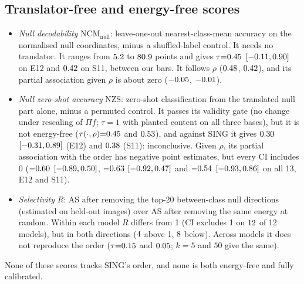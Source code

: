 \documentclass[10pt]{article}
\begin{document}
\subsection{Translator-free and energy-free scores}
\label{app:tfree}
\begin{itemize}
\item \emph{Null decodability} NCM$_{\mathrm{null}}$: leave-one-out nearest-class-mean accuracy on the normalised null coordinates, minus a shuffled-label control. It needs no translator. It ranges from $5.2$ to $80.9$ points and gives $\tau{=}0.45$ $[-0.11,0.90]$ on E12 and $0.42$ on S11, between our bars. It follows $\rho$ ($0.48$, $0.42$), and its partial association given $\rho$ is about zero ($-0.05$, $-0.01$).
\item \emph{Null zero-shot accuracy} NZS: zero-shot classification from the translated null part alone, minus a permuted control. It passes its validity gate (no change under rescaling of $\Pi f$; $\tau{=}1$ with planted content on all three bases), but it is not energy-free ($\tau(\cdot,\rho){=}0.45$ and $0.53$), and against SING it gives $0.30$ $[-0.31,0.89]$ (E12) and $0.38$ (S11): inconclusive. Given $\rho$, its partial association with the order has negative point estimates, but every CI includes 0 (${-0.60}$ $[-0.89,0.50]$, ${-0.63}$ $[-0.92,0.47]$ and ${-0.54}$ $[-0.93,0.86]$ on all 13, E12 and S11).
\item \emph{Selectivity} $R$: AS after removing the top-20 between-class null directions (estimated on held-out images) over AS after removing the same energy at random. Within each model $R$ differs from 1 (CI excludes 1 on $12$ of 12 models), but in both directions ($4$ above 1, $8$ below). Across models it does not reproduce the order ($\tau{=}0.15$ and $0.05$; $k{=}5$ and $50$ give the same).
\end{itemize}
None of these scores tracks SING's order, and none is both energy-free and fully calibrated.
\end{document}
